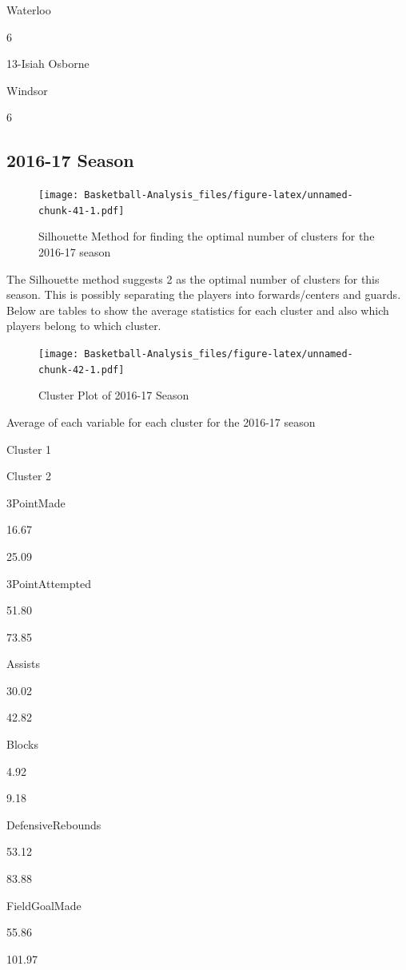 \documentclass[]{book}
\begin{document}
Waterloo

6

13-Isiah Osborne

Windsor

6

\hypertarget{season-1}{%
\subsection{2016-17 Season}\label{season-1}}

\begin{figure}
\centering
\texttt{[image: Basketball-Analysis\_files/figure-latex/unnamed-chunk-41-1.pdf]}
\caption{\label{fig:unnamed-chunk-41}Silhouette Method for finding the optimal number of clusters for the 2016-17 season}
\end{figure}

The Silhouette method suggests 2 as the optimal number of clusters for this season. This is possibly separating the players into forwards/centers and guards. Below are tables to show the average statistics for each cluster and also which players belong to which cluster.

\begin{figure}
\centering
\texttt{[image: Basketball-Analysis\_files/figure-latex/unnamed-chunk-42-1.pdf]}
\caption{\label{fig:unnamed-chunk-42}Cluster Plot of 2016-17 Season}
\end{figure}

\label{tab:unnamed-chunk-43}Average of each variable for each cluster for the 2016-17 season

Cluster 1

Cluster 2

3PointMade

16.67

25.09

3PointAttempted

51.80

73.85

Assists

30.02

42.82

Blocks

4.92

9.18

DefensiveRebounds

53.12

83.88

FieldGoalMade

55.86

101.97
\end{document}
